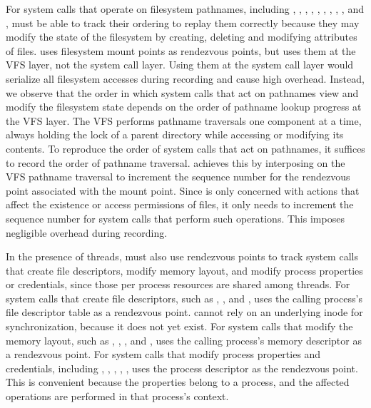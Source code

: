 For system calls that operate on filesystem pathnames, including
, , , , ,
, , , , and
, \scribe{} must be able to track their ordering to
replay them correctly because they may modify the state of the
filesystem by creating, deleting and modifying attributes of files.
\scribe{} uses filesystem mount points as rendezvous points, but uses
them at the VFS layer, not the system call
layer.  Using them at the system call layer would serialize
all filesystem accesses during recording and cause high overhead.
Instead, we observe that the order in which system calls that act 
on pathnames view and modify the filesystem state depends on
the order of pathname lookup progress at the 
VFS layer.  The VFS performs pathname traversals one component at a
time, always holding the lock of a parent directory while accessing or
modifying its contents.  To reproduce the order of system calls
that act on pathnames, it suffices to record the order of pathname 
traversal.  \scribe{} achieves this by interposing on the VFS pathname
traversal to increment the sequence number for the rendezvous point
associated with the mount point.  Since \scribe{} is only concerned
with actions that affect the existence or access permissions of files,
it only needs to increment the sequence number for system calls
that perform such operations.  This imposes negligible overhead during
recording.  

In the presence of threads, \scribe{} must also use rendezvous points
to track system calls that create file descriptors, modify memory
layout, and modify process properties or credentials, since those
per process resources are shared among threads.  
For system calls that create file descriptors, such as
, , and , \scribe{} uses the calling
process's file descriptor table as a rendezvous point.  \scribe{}
cannot rely on an underlying inode for synchronization, because it
does not yet exist.  
For system calls that modify the memory layout, such as ,
, , and , \scribe{}
uses the calling process's memory descriptor as a rendezvous point.  
For system calls that modify process properties and credentials,
including , , , ,
, \scribe{} uses the process descriptor as the
rendezvous point.  This is convenient because the properties belong to
a process, and the affected operations are performed in that process's
context. 

